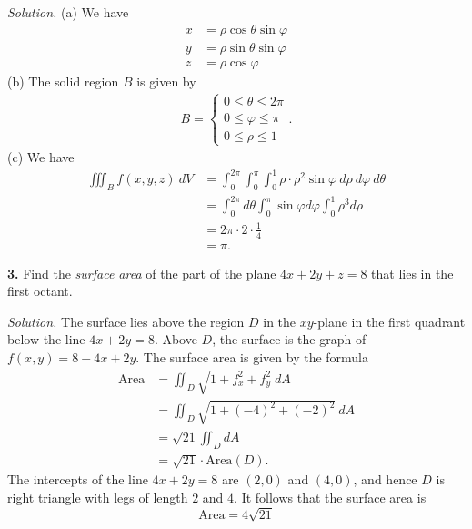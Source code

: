 \documentclass{article}
\begin{document}
{\color{blue}
\noindent \emph{Solution.} (a) We have 
\begin{align*}
x &= \rho \cos\theta \sin\varphi \\
y &= \rho \sin\theta \sin \varphi\\
z &= \rho \cos\varphi
\end{align*}
(b) The solid region $B$ is given by 
\begin{align*}
B = \begin{cases}
0 \leqslant \theta \leqslant 2\pi \\
0 \leqslant \varphi \leqslant \pi \\
0 \leqslant \rho \leqslant 1
\end{cases}.
\end{align*}
(c) We have 
\begin{align*}
\iiint_B f(x,y,z) \: dV &= \int_0^{2\pi} \int_{0}^\pi \int_{0}^1 \rho \cdot \rho^2 \sin\varphi \: d\rho \: d\varphi \: d\theta \\
&= \int_0^{2\pi} d\theta \int_0^\pi \sin\varphi d\varphi \int_0^1 \rho^3 d\rho \\
&= 2\pi \cdot 2 \cdot \frac{1}{4} \\
&= \pi.
\end{align*}
}


\vspace{3mm}

\noindent \textbf{3.} Find the \emph{surface area} of the part of the plane $4x + 2y + z = 8$ that lies in the first octant. 

\medskip 

{\color{blue}
\noindent \emph{Solution.} The surface lies above the region $D$ in the $xy$-plane in the first quadrant below the line $4x + 2y = 8$. Above $D$, the surface is the graph of $f(x,y) = 8 - 4x + 2y$. The surface area is given by the formula 
\begin{align*}
\text{Area} &= \iint_D \sqrt{1 + f_x^2 + f_y^2} \: dA \\
&= \iint_D \sqrt{1 + (-4)^2 + (-2)^2} \: dA \\
&=\sqrt{21}  \iint_D dA \\
&= \sqrt{21} \cdot \text{Area}(D).
\end{align*}
The intercepts of the line $4x + 2y = 8$ are $(2,0)$ and $(4,0)$, and hence $D$ is right triangle with legs of length $2$ and $4$. It follows that the surface area is 
\[
\text{Area} = 4\sqrt{21} 
\]
}
\end{document}
